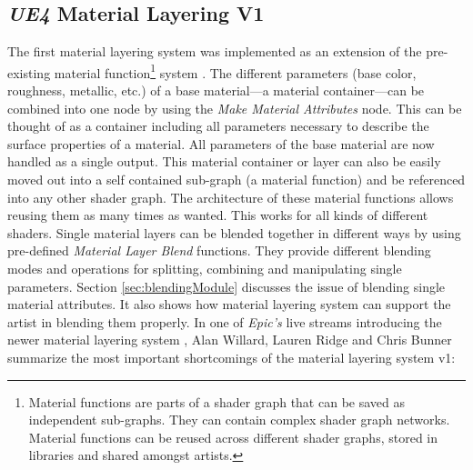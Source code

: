 \subsection{\emph{UE4} Material Layering V1}\label{sec:matLayV1}
The first material layering system was implemented as an extension of the pre-existing material function\footnote{ Material functions are parts of a shader graph that can be saved as independent sub-graphs. They can contain complex shader graph networks. Material functions can be reused across different shader graphs, stored in libraries and shared amongst artists.} system \cite{epic2015LayeredMats}. 
The different parameters (base color, roughness, metallic, etc.) of a base material---a material container---can be combined into one node by using the \emph{Make Material Attributes} node. This can be thought of as a container including all parameters necessary to describe the surface properties of a material. All parameters of the base material are now handled as a single output. This material container or layer can also be easily moved out into a self contained sub-graph (a material function) and be referenced into any other shader graph. The architecture of these material functions allows reusing them as many times as wanted. This works for all kinds of different shaders. Single material layers can be blended together in different ways by using pre-defined \emph{Material Layer Blend} functions. They provide different blending modes and operations for splitting, combining and manipulating single parameters. Section \ref{sec:blendingModule} discusses the issue of blending single material attributes. It also shows how material layering system can support the artist in blending them properly. In one of \emph{Epic's} live streams introducing the newer material layering system \cite{unreal2018materialLayering}, Alan Willard, Lauren Ridge and Chris Bunner summarize the most important shortcomings of the material layering system v1:

